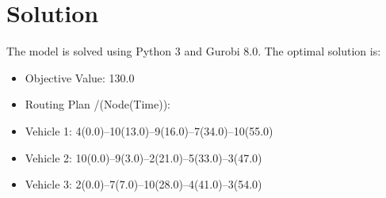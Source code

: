 \documentclass[a4paper]{article}
\begin{document}
\section{Solution}
The model is solved using Python 3 and Gurobi 8.0. The optimal solution is:\\
\begin{itemize}
  \item Objective Value: 130.0
  \item Routing Plan /(Node(Time)):
  \item Vehicle 1: 4(0.0)--10(13.0)--9(16.0)--7(34.0)--10(55.0)
  \item Vehicle 2: 10(0.0)--9(3.0)--2(21.0)--5(33.0)--3(47.0)
  \item Vehicle 3: 2(0.0)--7(7.0)--10(28.0)--4(41.0)--3(54.0)
\end{itemize}
\end{document}
